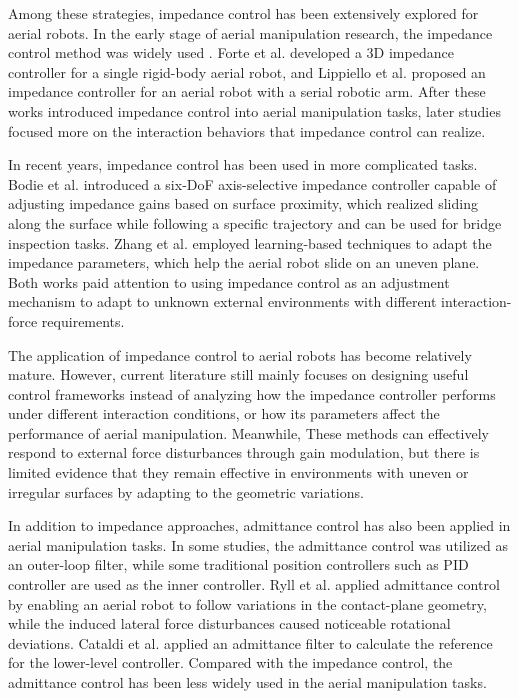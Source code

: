 Among these strategies, impedance control has been extensively explored for aerial robots. 
In the early stage of aerial manipulation research, the impedance control method was widely used \cite{ollero_2021_past}. Forte et al. \cite{forte_2012_impedance} developed a 3D impedance controller for a single rigid-body aerial robot, and Lippiello et al. \cite{lippiello_2012_cartesian} proposed an impedance controller for an aerial robot with a serial robotic arm. After these works introduced impedance control into aerial manipulation tasks, later studies focused more on the interaction behaviors that impedance control can realize.

In recent years, impedance control has been used in more complicated tasks.
Bodie et al. \cite{bodie_2020_active} introduced a six-DoF axis-selective impedance controller capable of adjusting impedance gains based on surface proximity, which realized sliding along the surface while following a specific trajectory and can be used for bridge inspection tasks. Zhang et al. \cite{zhang_2022_learning} employed learning-based techniques to adapt the impedance parameters, which help the aerial robot slide on an uneven plane. Both works paid attention to using impedance control as an adjustment mechanism to adapt to unknown external environments with different interaction-force requirements.


The application of impedance control to aerial robots has become relatively mature. However, current literature still mainly focuses on designing useful control frameworks instead of analyzing how the impedance controller performs under different interaction conditions, or how its parameters affect the performance of aerial manipulation. Meanwhile, These methods can effectively respond to external force disturbances through gain modulation, but there is limited evidence that they remain effective in environments with uneven or irregular surfaces by adapting to the geometric variations. 


In addition to impedance approaches, admittance control has also been applied in aerial manipulation tasks. In some studies, the admittance control was utilized as an outer-loop filter, while some traditional position controllers such as PID controller are used as the inner controller. Ryll et al. \cite{ryll_2019_6d} applied admittance control by enabling an aerial robot to follow variations in the contact-plane geometry, while the induced lateral force disturbances caused noticeable rotational deviations. Cataldi et al. \cite{cataldi_2016_impedance} applied an admittance filter to calculate the reference for the lower-level controller. Compared with the impedance control, the admittance control has been less widely used in the aerial manipulation tasks.


